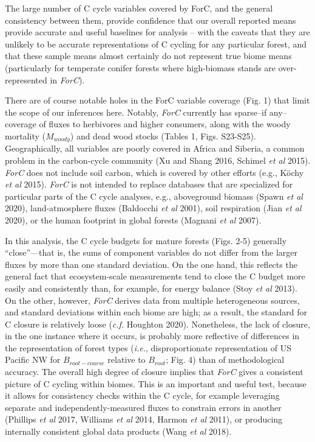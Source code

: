 \documentclass[
]{article}
\begin{document}
The large number of C cycle variables covered by ForC, and the general
consistency between them, provide confidence that our overall reported
means provide accurate and useful baselines for analysis -- with the
caveats that they are unlikely to be accurate representations of C
cycling for any particular forest, and that these sample means almost
certainly do not represent true biome means (particularly for temperate
conifer forests where high-biomass stands are over-represented in
\emph{ForC}).

There are of course notable holes in the ForC variable coverage (Fig. 1)
that limit the scope of our inferences here. Notably, \emph{ForC}
currently has sparse--if any--coverage of fluxes to herbivores and
higher consumers, along with the woody mortality (\(M_{woody}\)) and
dead wood stocks (Tables 1, Figs. S23-S25). Geographically, all
variables are poorly covered in Africa and Siberia, a common problem in
the carbon-cycle community (Xu and Shang 2016, Schimel \emph{et al}
2015). \emph{ForC} does not include soil carbon, which is covered by
other efforts (e.g., Köchy \emph{et al} 2015). \emph{ForC} is not
intended to replace databases that are specialized for particular parts
of the C cycle analyses, e.g., aboveground biomass (Spawn \emph{et al}
2020), land-atmosphere fluxes (Baldocchi \emph{et al} 2001), soil
respiration (Jian \emph{et al} 2020), or the human footprint in global
forests (Magnani \emph{et al} 2007).

In this analysis, the C cycle budgets for mature forests (Figs. 2-5)
generally ``close''---that is, the sums of component variables do not
differ from the larger fluxes by more than one standard deviation. On
the one hand, this reflects the general fact that ecosystem-scale
measurements tend to close the C budget more easily and consistently
than, for example, for energy balance (Stoy \emph{et al} 2013). On the
other, however, \emph{ForC} derives data from multiple heterogeneous
sources, and standard deviations within each biome are high; as a
result, the standard for C closure is relatively loose (\emph{c.f.}
Houghton 2020). Nonetheless, the lack of closure, in the one instance
where it occurs, is probably more reflective of differences in the
representation of forest types (\emph{i.e.}, disproportionate
representation of US Pacific NW for \(B_{root-coarse}\) relative to
\(B_{root}\); Fig. 4) than of methodological accuracy. The overall high
degree of closure implies that \emph{ForC} gives a consistent picture of
C cycling within biomes. This is an important and useful test, because
it allows for consistency checks within the C cycle, for example
leveraging separate and independently-measured fluxes to constrain
errors in another (Phillips \emph{et al} 2017, Williams \emph{et al}
2014, Harmon \emph{et al} 2011), or producing internally consistent
global data products (Wang \emph{et al} 2018).
\end{document}
